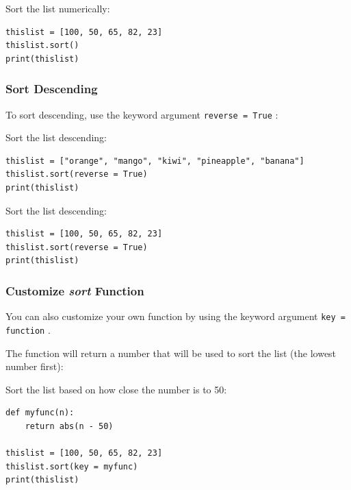 \documentclass[12pt,a4paper]{article}
\newcommand{\code}[1]{%
	\colorbox{backcolour}{\lstinline{#1}}%
}
\begin{document}
\begin{ebox}
Sort the list numerically:
	\begin{lstlisting}
thislist = [100, 50, 65, 82, 23]
thislist.sort()
print(thislist)
	\end{lstlisting}
\tcblower
	\begin{vercode}
[23, 50, 65, 82, 100]
	\end{vercode}
\end{ebox}
\subsubsection{Sort Descending}

To sort descending, use the keyword argument \code{reverse = True}:

\begin{ebox}
Sort the list descending:
	\begin{lstlisting}
thislist = ["orange", "mango", "kiwi", "pineapple", "banana"]
thislist.sort(reverse = True)
print(thislist)
	\end{lstlisting}
\tcblower
	\begin{vercode}
	\end{vercode}
\end{ebox}

\begin{ebox}
Sort the list descending:
	\begin{lstlisting}
thislist = [100, 50, 65, 82, 23]
thislist.sort(reverse = True)
print(thislist)
	\end{lstlisting}
\tcblower
	\begin{vercode}
[100, 82, 65, 50, 23]
	\end{vercode}
\end{ebox}
\subsubsection{Customize \textit{sort} Function}

You can also customize your own function by using the keyword argument
\code{key = function}.

The function will return a number that will be used to sort the list (the
lowest number first):

\begin{ebox}
Sort the list based on how close the number is to 50:
	\begin{lstlisting}
def myfunc(n):
    return abs(n - 50)

thislist = [100, 50, 65, 82, 23]
thislist.sort(key = myfunc)
print(thislist)
	\end{lstlisting}
\tcblower
	\begin{vercode}
[50, 65, 23, 82, 100]
	\end{vercode}
\end{ebox}
\end{document}
